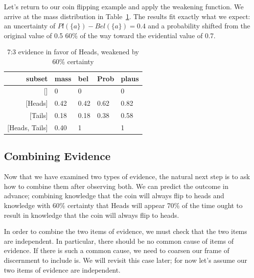 \documentclass[letterpaper]{article}
\begin{document}
Let's return to our coin flipping example and apply the weakening function.  We arrive at the mass distribution in Table~\ref{tab:CoinFlipWeakened}.  The results fit exactly what we expect: an uncertainty of $Pl(\{a\})-Bel(\{a\})=0.4$ and a probability shifted from the original value of 0.5 60\% of the way toward the evidential value of 0.7.
\begin{table}[htbp]
\centering
\caption{7:3 evidence in favor of Heads, weakened by 60\% certainty}
\begin{tabular}{rllll}
\toprule
                subset&mass &bel  &Prob &plaus\\
\midrule
                    {[]}&0    &0    &     &0    \\
               {[Heads]}&0.42&0.42&0.62&0.82\\
               {[Tails]}&0.18&0.18&0.38&0.58\\
        {[Heads, Tails]}&0.40&1    &     &1    \\
\bottomrule
\end{tabular}
\label{tab:CoinFlipWeakened}
\end{table}

\subsection{Combining Evidence}
Now that we have examined two types of evidence, the natural next step is to ask how to combine them after observing both.  We can predict the outcome in advance; combining knowledge that the coin will always flip to heads and knowledge with 60\% certainty that Heads will appear 70\% of the time ought to result in knowledge that the coin will always flip to heads.  

In order to combine the two items of evidence, we must check that the two items are independent.  In particular, there should be no common cause of items of evidence.  If there is such a common cause, we need to coarsen our frame of discernment to include is.  We will revisit this case later; for now let's assume our two items of evidence are independent.
\end{document}
